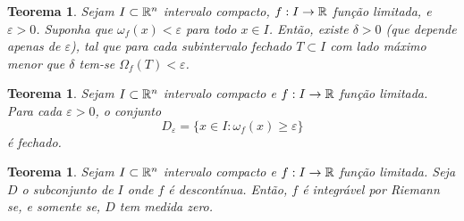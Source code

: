 \documentclass[a4paper,12pt]{extreport}
\newtheorem{myteo}[mydef]{Teorema}
\newif\ifspacesbetweentheos
\newcommand{\theospace}[1]{
\ifspacesbetweentheos
  \vspace{#1}
\fi
}
\newcommand{\theonewpage}{
\ifspacesbetweentheos
  \newpage
\fi
}
\begin{document}
\begin{myteo}
  Sejam $I \subset \mathbb{R}^n$ intervalo compacto,
  $f:I \to \mathbb{R}$ função limitada,
  e $\varepsilon > 0$.
  Suponha que $\omega_f(x) < \varepsilon$
  para todo $x \in I$.
  Então, existe $\delta > 0$
  (que depende apenas de $\varepsilon$),
  tal que para cada subintervalo fechado
  $T \subset I$ com lado máximo menor que $\delta$
  tem-se $\Omega_f(T) < \varepsilon$.
\end{myteo}

\theospace{9cm}

\begin{myteo}
  Sejam $I \subset \mathbb{R}^n$ intervalo compacto e
  $f:I \to \mathbb{R}$ função limitada.
  Para cada $\varepsilon > 0$, o conjunto
  \begin{equation}
    D_\varepsilon = \{ x \in I: \omega_f(x) \ge \varepsilon \}
  \end{equation}
  é fechado.
\end{myteo}



\theonewpage


\begin{myteo}\label{teo:lebesgue_crit}
  Sejam $I \subset \mathbb{R}^n$ intervalo compacto e
  $f:I \to \mathbb{R}$ função limitada.
  Seja $D$ o subconjunto de $I$ onde $f$ é descontínua.
  Então, $f$ é integrável por Riemann se, e somente se,
  $D$ tem medida zero.
\end{myteo}


\theonewpage
\end{document}

